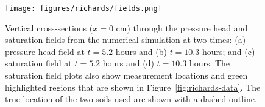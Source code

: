 \begin{figure}[!htbp]
\begin{center}
\texttt{[image: figures/richards/fields.png]}
\end{center}
\caption{Vertical cross-sections ($x=0$ cm) through the pressure head and saturation fields from the numerical simulation at two times: (a) pressure head field at $t=5.2$ hours and (b) $t=10.3$ hours; and (c) saturation field at $t=5.2$ hours and (d) $t=10.3$ hours. The saturation field plots also show measurement locations and green highlighted regions that are shown in Figure~\ref{fig:richards-data}. The true location of the two soils used are shown with a dashed outline.}
\label{fig:richards-fields}
\end{figure}
